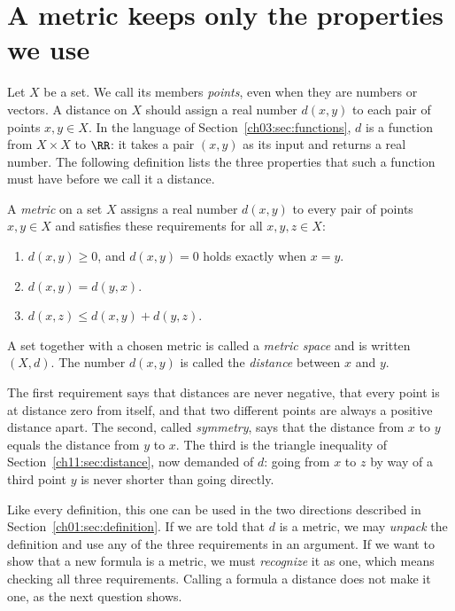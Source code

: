 \section{A metric keeps only the properties we use}\label{ch11:sec:metric}
Let $X$ be a set. We call its members \emph{points}, even when they are numbers or vectors. A distance on $X$ should assign a real number $d(x,y)$ to each pair of points $x,y\in X$. In the language of Section~\ref{ch03:sec:functions}, $d$ is a function from $X\times X$ to $\RR$: it takes a pair $(x,y)$ as its input and returns a real number. The following definition lists the three properties that such a function must have before we call it a distance.
\par\noindent\begin{minipage}{\linewidth}
\begin{definition}[Metric]\label{def:metric}
A \emph{metric} on a set $X$ assigns a real number $d(x,y)$ to every pair of points $x,y\in X$ and satisfies these requirements for all $x,y,z\in X$:
\begin{enumerate}
\item $d(x,y)\ge0$, and $d(x,y)=0$ holds exactly when $x=y$.
\item $d(x,y)=d(y,x)$.
\item $d(x,z)\le d(x,y)+d(y,z)$.
\end{enumerate}
A set together with a chosen metric is called a \emph{metric space} and is written $(X,d)$. The number $d(x,y)$ is called the \emph{distance} between $x$ and $y$.
\end{definition}
\end{minipage}\par

The first requirement says that distances are never negative, that every point is at distance zero from itself, and that two different points are always a positive distance apart. The second, called \emph{symmetry}, says that the distance from $x$ to $y$ equals the distance from $y$ to $x$. The third is the triangle inequality of Section~\ref{ch11:sec:distance}, now demanded of $d$: going from $x$ to $z$ by way of a third point $y$ is never shorter than going directly.

Like every definition, this one can be used in the two directions described in Section~\ref{ch01:sec:definition}. If we are told that $d$ is a metric, we may \emph{unpack} the definition and use any of the three requirements in an argument. If we want to show that a new formula is a metric, we must \emph{recognize} it as one, which means checking all three requirements. Calling a formula a distance does not make it one, as the next question shows.


